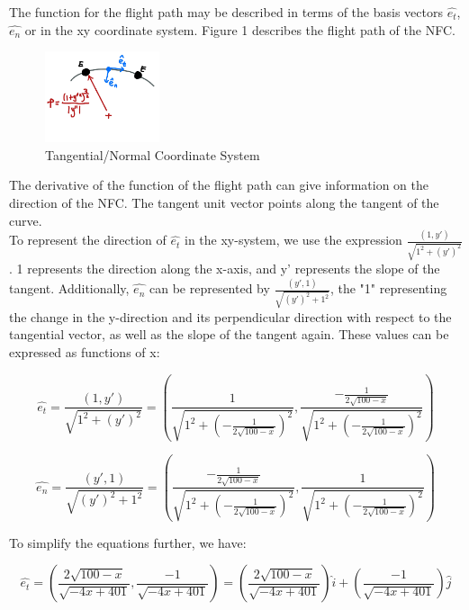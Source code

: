 \documentclass[12pt, a4paper]{article}
\begin{document}
The function for the flight path may be described in terms of the basis vectors $\hat{e_t}$, $\hat{e_n}$ or in the xy coordinate system. Figure 1 describes the flight path of the NFC.

\begin{figure}[htbp]
    \centering
    \includegraphics[width=0.3\textwidth]{figure1.jpeg}
    \caption{Tangential/Normal Coordinate System}
    \label{fig:label2}
\end{figure}

The derivative of the function of the flight path can give information on the direction of the NFC. The tangent unit vector points along the tangent of the curve. \\

To represent the direction of $\hat{e_t}$ in the xy-system, we use the expression $\frac{(1, y')}{\sqrt{1^2+(y')^2}}$. 1 represents the direction along the x-axis, and y' represents the slope of the tangent. Additionally, $\hat{e_n}$ can be represented by $\frac{(y', 1)}{\sqrt{(y')^2+1^2}}$, the "1" representing the change in the y-direction and its perpendicular direction with respect to the tangential vector, as well as the slope of the tangent again. These values can be expressed as functions of x: 

\begin{equation}
    \hat{e_t} = \frac{(1, y')}{\sqrt{1^2+(y')^2}} = (\frac{1}{\sqrt{1^2+(- \frac{1}{2\sqrt{100-x}})^2}}, \frac{- \frac{1}{2\sqrt{100-x}}}{\sqrt{1^2+(- \frac{1}{2\sqrt{100-x}})^2}})
\end{equation}

\begin{equation}
    \hat{e_n} = \frac{(y', 1)}{\sqrt{(y')^2+1^2}} = (\frac{- \frac{1}{2\sqrt{100-x}}}{\sqrt{1^2+(- \frac{1}{2\sqrt{100-x}})^2}}, \frac{1}{\sqrt{1^2+(- \frac{1}{2\sqrt{100-x}})^2}})
\end{equation}

To simplify the equations further, we have: 

\begin{equation}
    \hat{e_t} = (\frac{2\sqrt{100-x}}{\sqrt{-4x+401}}, \frac{-1}{\sqrt{-4x+401}}) = (\frac{2\sqrt{100-x}}{\sqrt{-4x+401}})\hat{i} + (\frac{-1}{\sqrt{-4x+401}})\hat{j}
\end{equation}
\end{document}
